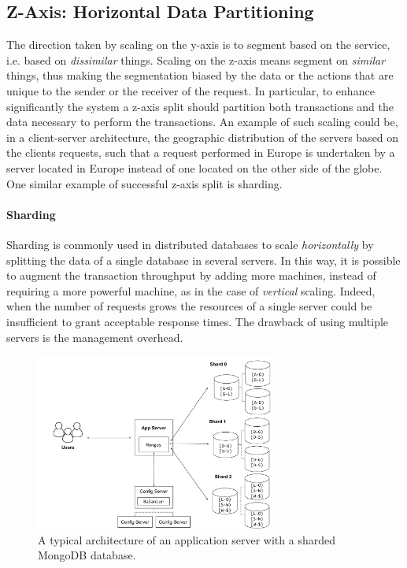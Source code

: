 \subsection{Z-Axis: Horizontal Data Partitioning}
\label{sec:z-axis}

The direction taken by scaling on the y-axis is to segment based on the service,
i.e. based on \emph{dissimilar} things. Scaling on the z-axis means segment on
\emph{similar} things, thus making the segmentation biased by the data or the
actions that are unique to the sender or the receiver of the request. In
particular, to enhance significantly the system a z-axis split should partition
both transactions and the data necessary to perform the transactions. An example
of such scaling could be, in a client-server architecture, the geographic
distribution of the servers based on the clients requests, such that a request
performed in Europe is undertaken by a server located in Europe instead of one
located on the other side of the globe. One similar example of successful z-axis
split is sharding.

\paragraph{Sharding}
Sharding is commonly used in distributed databases to scale \emph{horizontally}
by splitting the data of a single database in several servers. In this way, it
is possible to augment the transaction throughput by adding more machines,
instead of requiring a more powerful machine, as in the case of \emph{vertical}
scaling.
Indeed, when the number of requests grows the resources of a single server
could be insufficient to grant acceptable response times. The drawback of using
multiple servers is the management overhead.


\begin{figure}
  \begin{center}
    \includegraphics[width=0.7\textwidth]{./res/img/mongodb}
    \caption{A typical architecture of an application server with a sharded
    MongoDB database.}
    \label{fig:mongodb}
  \end{center}
\end{figure}

